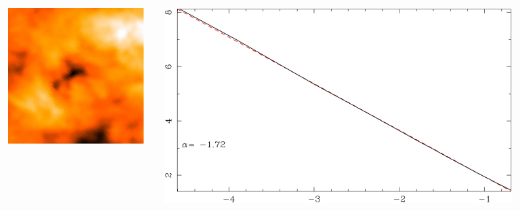 {{\begin{columns}[t,onlytextwidth]
  \begin{center}
    \includegraphics[width=\textwidth,height=!]{./A/zoph_sfd_3deg.jpg}
  \end{center}



  \begin{center}
    \includegraphics[width=\textwidth,height=!]{./A/sfdpowerspec.pdf}
  \end{center}

\end{columns}


\vfill

}

}
